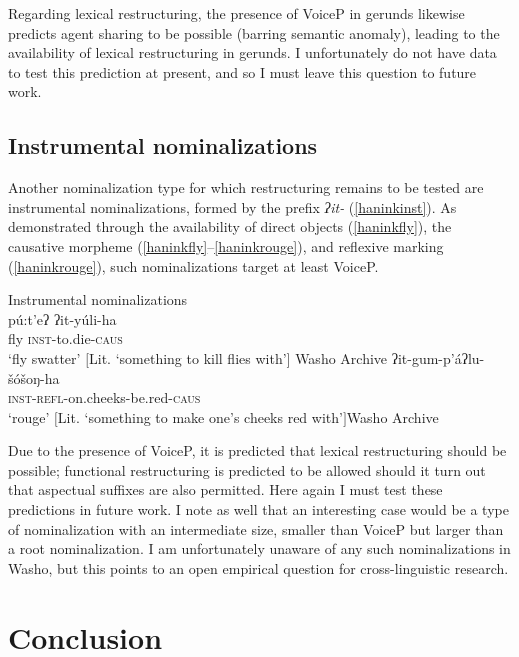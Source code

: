 \documentclass[output=paper]{langscibook}
\begin{document}
Regarding lexical restructuring, the presence of VoiceP in gerunds likewise predicts agent sharing to be possible (barring semantic anomaly), leading to the availability of lexical restructuring in gerunds. I unfortunately do not have data to test this prediction at present, and so I must leave this question to future work.


\subsection{Instrumental nominalizations}

Another nominalization type for which restructuring remains to be tested are instrumental nominalizations, formed by the prefix {\itshape ʔit-} (\ref{haninkinst}). As demonstrated through the availability of direct objects (\ref{haninkfly}), the causative morpheme (\ref{haninkfly}--\ref{haninkrouge}), and reflexive marking (\ref{haninkrouge}), such nominalizations target at least VoiceP.
 
\ea Instrumental nominalizations\label{haninkinst}\\
\ea \gll pú:t'eʔ ʔit-yúli-ha\\
fly {\scshape inst}-to.die-{\scshape caus}\\
\glt `fly swatter' $[$Lit. `something to kill flies with'$]$ \hfill Washo Archive \label{haninkfly}
\ex \gll ʔit-gum-p'áʔlu-šóšoŋ-ha\\
{\scshape inst-refl}-on.cheeks-be.red-{\scshape caus}\\
\glt `rouge'   $[$Lit. `something to make one's cheeks red with'$]$\hfill Washo Archive \label{haninkrouge}
\z
\z
 
Due to the presence of VoiceP, it is predicted that lexical restructuring should be possible; functional restructuring is predicted to be allowed should it turn out that aspectual suffixes are also permitted. Here again I must test these predictions in future work. I note as well that an interesting case would be a type of nominalization with an intermediate size, smaller than VoiceP but larger than a root nominalization. I am unfortunately unaware of any such nominalizations in Washo, but this points to an  open empirical question for cross-linguistic research. 

 \section{Conclusion}
 
 
\end{document}
